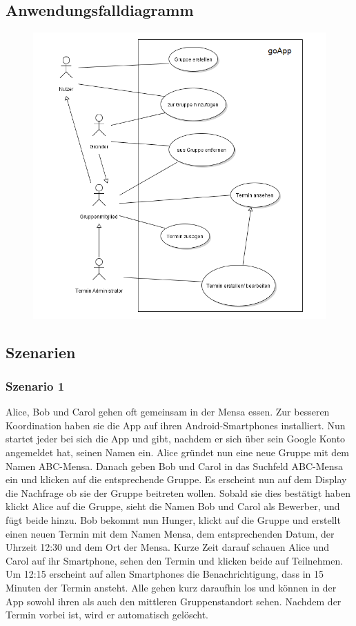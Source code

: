\documentclass{scrartcl}
\begin{document}
	\subsection{Anwendungsfalldiagramm}
	\begin{figure}[h]
	\includegraphics[width=\textwidth]{goApp_useCase}
	\end{figure}

	\newpage
	
	\subsection{Szenarien}
	\subsubsection{Szenario 1}
	Alice, Bob und Carol gehen oft gemeinsam in der Mensa essen. Zur besseren Koordination haben sie die App auf ihren Android-Smartphones installiert.
	Nun startet jeder bei sich die App und gibt, nachdem er sich über sein Google Konto angemeldet hat, seinen Namen ein.
	Alice gründet nun eine neue Gruppe mit dem Namen ABC-Mensa. Danach geben Bob und Carol in das Suchfeld ABC-Mensa ein und klicken auf die entsprechende Gruppe.
	Es erscheint nun auf dem Display die Nachfrage ob sie der Gruppe beitreten wollen. Sobald sie dies bestätigt haben klickt Alice auf die Gruppe,
	sieht die Namen Bob und Carol als Bewerber, und fügt beide hinzu.
	Bob bekommt nun Hunger, klickt auf die Gruppe und erstellt einen neuen Termin mit dem Namen Mensa, dem entsprechenden Datum, der Uhrzeit 12:30 und dem Ort der Mensa.
	Kurze Zeit darauf schauen Alice und Carol auf ihr Smartphone, sehen den Termin und klicken beide auf \glqq{}Teilnehmen\grqq{}.
	Um 12:15 erscheint auf allen Smartphones die Benachrichtigung, dass in 15 Minuten der Termin ansteht.
	Alle gehen kurz daraufhin los und können in der App sowohl ihren als auch den mittleren Gruppenstandort sehen.
	Nachdem der Termin vorbei ist, wird er automatisch gelöscht.
	
\end{document}
